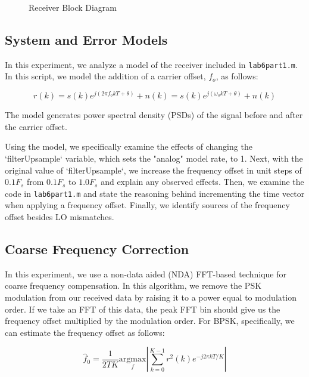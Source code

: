 \documentclass{article}
\begin{document}
\begin{figure}[H]
	\centerline{}
	\caption{Receiver Block Diagram}
	\label{fig::receiver_block_diagram}
\end{figure}

\subsection{System and Error Models}

In this experiment, we analyze a model of the receiver included in \texttt{lab6part1.m}. In this script, we model the addition of a carrier offset, $f_o$, as follows:

\begin{equation}
	r(k) = s(k)e^{j(2{\pi}f_okT+\theta)}+n(k) = s(k)e^{j(\omega_okT+\theta)}+n(k)
\end{equation}

\noindent The model generates power spectral density (PSDs) of the signal before and after the carrier offset.

Using the model, we specifically examine the effects of changing the `filterUpsample` variable, which sets the "analog" model rate, to 1. Next, with the original value of `filterUpsample`, we increase the frequency offset in unit steps of $0.1F_s$ from $0.1F_s$ to $1.0F_s$ and explain any observed effects. Then, we examine the code in \texttt{lab6part1.m} and state the reasoning behind incrementing the time vector when applying a frequency offset. Finally, we identify sources of the frequency offset besides LO mismatches.

\subsection{Coarse Frequency Correction}

In this experiment, we use a non-data aided (NDA) FFT-based technique for coarse frequency compensation. In this algorithm, we remove the PSK modulation from our received data by raising it to a power equal to modulation order. If we take an FFT of this data, the peak FFT bin should give us the frequency offset multiplied by the modulation order. For BPSK, specifically, we can estimate the frequency offset as follows:

\begin{equation}
	\label{eq::bpsk_coarse_freq_est}	
	\hat{f}_0 = \frac{1}{2TK}\underset{f}{\text{argmax}}\left\vert\sum_{k=0}^{K-1}{r^2(k)e^{-j2{\pi}kT/K}}\right\vert
\end{equation}
\end{document}
